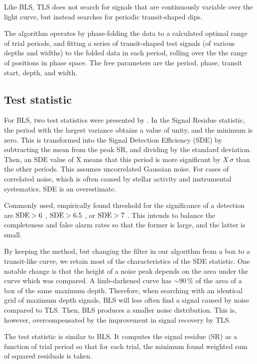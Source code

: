 \documentclass[twocolumn,tighten,longauthor]{myaastex62}
\begin{document}
Like BLS, TLS does not search for signals that are continuously variable over the light curve, but instead searches for periodic transit-shaped dips.

The algorithm operates by phase-folding the data to a calculated optimal range of trial periods, and fitting a series of transit-shaped test signals (of various depths and widths) to the folded data in each period, rolling over the the range of positions in phase space. The free parameters are the period, phase, transit start, depth, and width.


\subsection{Test statistic}
For BLS, two test statistics were presented by \citet{2002A&A...391..369K}. In the Signal Residue statistic, the period with the largest variance obtains a value of unity, and the minimum is zero. This is transformed into the Signal Detection Efficiency (SDE) by subtracting the mean from the peak SR, and dividing by the standard deviation. Then, an SDE value of X means that this period is more significant by $X\,\sigma$ than the other periods. This assumes uncorrelated Gaussian noise. For cases of correlated noise, which is often caused by stellar activity and instrumental systematics, SDE is an overestimate.

Commonly used, empirically found threshold for the significance of a detection are ${\rm SDE}>6$ \citep{2015ApJ...807...45D}, ${\rm SDE}>6.5$ \citep{2018AJ....156...78L}, or ${\rm SDE}>7$ \citep{2012ApJ...761..123S}. This intends to balance the completeness and false alarm rates so that the former is large, and the latter is small.

By keeping the method, but changing the filter in our algorithm from a box to a transit-like curve, we retain most of the characteristics of the SDE statistic. One notable change is that the height of a noise peak depends on the area under the curve which was compared. A limb-darkened curve has $\sim90\,$\% of the area of a box of the same maximum depth. Therefore, when searching with an identical grid of maximum depth signals, BLS will less often find a signal caused by noise compared to TLS. Then, BLS produces a smaller noise distribution. This is, however, overcompensated by the improvement in signal recovery by TLS.


The test statistic is similar to BLS. It computes the signal residue (SR) as a function of trial period so that for each trial, the minimum found weighted sum of squared residuals is taken.
\end{document}
